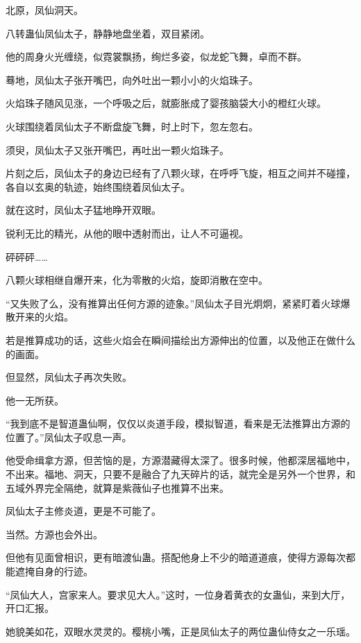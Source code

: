 
\begin{this_body}



北原，凤仙洞天。

八转蛊仙凤仙太子，静静地盘坐着，双目紧闭。

他的周身火光缠绕，似霓裳飘扬，绚烂多姿，似龙蛇飞舞，卓而不群。

蓦地，凤仙太子张开嘴巴，向外吐出一颗小小的火焰珠子。

火焰珠子随风见涨，一个呼吸之后，就膨胀成了婴孩脑袋大小的橙红火球。

火球围绕着凤仙太子不断盘旋飞舞，时上时下，忽左忽右。

须臾，凤仙太子又张开嘴巴，再吐出一颗火焰珠子。

片刻之后，凤仙太子的身边已经有了八颗火球，在呼呼飞旋，相互之间并不碰撞，各自以玄奥的轨迹，始终围绕着凤仙太子。

就在这时，凤仙太子猛地睁开双眼。

锐利无比的精光，从他的眼中透射而出，让人不可逼视。

砰砰砰……

八颗火球相继自爆开来，化为零散的火焰，旋即消散在空中。

“又失败了么，没有推算出任何方源的迹象。”凤仙太子目光炯炯，紧紧盯着火球爆散开来的火焰。

若是推算成功的话，这些火焰会在瞬间描绘出方源伸出的位置，以及他正在做什么的画面。

但显然，凤仙太子再次失败。

他一无所获。

“我到底不是智道蛊仙啊，仅仅以炎道手段，模拟智道，看来是无法推算出方源的位置了。”凤仙太子叹息一声。

他受命缉拿方源，但苦恼的是，方源潜藏得太深了。很多时候，他都深居福地中，不出来。福地、洞天，只要不是融合了九天碎片的话，就完全是另外一个世界，和五域外界完全隔绝，就算是紫薇仙子也推算不出来。

凤仙太子主修炎道，更是不可能了。

当然。方源也会外出。

但他有见面曾相识，更有暗渡仙蛊。搭配他身上不少的暗道道痕，使得方源每次都能遮掩自身的行迹。

“凤仙大人，宫家来人。要求见大人。”这时，一位身着黄衣的女蛊仙，来到大厅，开口汇报。

她貌美如花，双眼水灵灵的。樱桃小嘴，正是凤仙太子的两位蛊仙侍女之一乐瑶。


\end{this_body}
